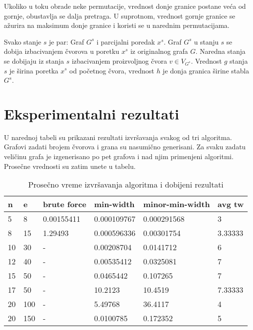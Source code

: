 \documentclass[10pt]{article}
\begin{document}
Ukoliko u toku obrade neke permutacije, vrednost donje granice postane veća od gornje, obustavlja se dalja pretraga.
U suprotnom, vrednost gornje granice se ažurira na maksimum donje granice i koristi se u narednim permutacijama.

Svako stanje $s$ je par: Graf ${G^s}$ i parcijalni poredak ${x^s}$. Graf ${G^s}$ u stanju $s$ se dobija izbacivanjem čvorova u poretku ${x^s}$ iz originalnog grafa $G$. Naredna stanja se dobijaju iz stanja $s$ izbacivanjem proizvoljnog čvora $v \in V_{G^s}$. Vrednost $g$ stanja $s$ je širina poretka ${x^s}$ od početnog čvora, vrednost $h$ je donja granica širine stabla ${G^s}$.

\section{Eksperimentalni rezultati}


U narednoj tabeli su prikazani rezultati izvršavanja svakog od tri algoritma. Grafovi zadati brojem čvorova i grana su nasumično generisani. Za svaku zadatu veličinu grafa je izgenerisano po pet grafova i nad njim primenjeni algoritmi. Prosečne vrednosti su zatim unete u tabelu.

\begin{table}[h]
\begin{minipage}{.95\textwidth}
\begin{center}\small
    \begin{tabular}{ | p{0.5cm} | p{0.5cm} | p{2cm} | p{3cm} | p{2cm} | p{1cm}|}
    \hline
    \textbf{n} & \textbf{e} & \textbf{brute force} & \textbf{min-width} & \textbf{minor-min-width} & \textbf{avg tw} \\ \hline
    5 & 8 & 0.00155411 & 0.000109767 & 0.000291568 & 3\\ \hline
    8 & 15 & 1.29493 & 0.000596336 & 0.00301754 & 3.33333\\ \hline
    10 & 30 & - & 0.00208704 & 0.0141712 & 6\\ \hline
    12 & 40 & - & 0.00535412 & 0.0325081 & 7\\ \hline
    15 & 50 & - & 0.0465442 & 0.107265 & 7\\ \hline
    17 & 50 & - & 10.2123 & 10.4519 & 7.33333\\ \hline
    20 & 100 & - & 5.49768 & 36.4117 & 4\\ \hline
    20 & 150 & - & 0.0100785 & 0.172352 & 5\\ \hline
    \end{tabular}
    \caption {Prosečno vreme izvršavanja algoritma i dobijeni rezultati}
    \label{analogiesTableEq}
\end{center}
\end{minipage}%
\end{table}
\end{document}
